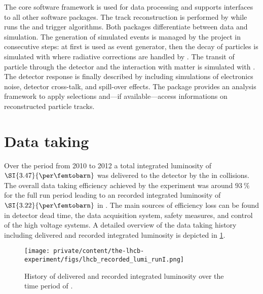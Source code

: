 The \LHCb core software framework \Gaudi \cite{set:soft:gaudi} is used for data
processing and supports interfaces to all other software packages. The track
reconstruction is performed by \Brunel \cite{soft:brunel} while \Moore
\cite{soft:moore} runs the \HLTOne and \HLTTwo trigger algorithms. Both packages
differentiate between data and simulation. The generation of simulated events is
managed by the \Gauss \cite{set:soft:gauss} project in consecutive steps: at
first \Pythia \cite{set:soft:pythia} is used as event generator, then the decay
of particles is simulated with \EvtGen \cite{Lange:2001uf} where radiative
corrections are handled by \Photos \cite{set:soft:photos}. The transit of
particle through the detector and the interaction with matter is simulated with
\GeantFour \cite{set:soft:geantfour}. The detector response is finally described
by \Boole \cite{soft:boole} including simulations of electronics noise, detector
cross-talk, and spill-over effects. The \DaVinci \cite{soft:davinci} package
provides an analysis framework to apply selections and---if available---access
\MC informations on reconstructed particle tracks.

\section{Data taking}
\label{sec:lhcb_experiment:data}

Over the \RunOne period from 2010 to 2012 a total integrated luminosity of
$\SI{3.47}{\per\femtobarn}$ was delivered to the \LHCb detector by the \LHC in
\protonproton collisions. The overall data taking efficiency achieved by the
experiment was around $\SI{93}{\percent}$ for the full run period leading to an
recorded integrated luminosity of $\SI{3.22}{\per\femtobarn}$ in \RunOne. The
main sources of efficiency loss can be found in detector dead time, the data
acquisition system, \VELO safety measures, and control of the high voltage
systems. A detailed overview of the data taking history including delivered and
recorded integrated luminosity is depicted in
\cref{fig:lhcb_experiment:data:integrated_lumi}.
%
\begin{figure}[t]
  \centering
  \texttt{[image: private/content/the-lhcb-experiment/figs/lhcb\_recorded\_lumi\_runI.png]}
  \caption{
    History of delivered and recorded integrated luminosity over the time period
  of \RunOne \cite{lhcb:luminosity}. }
  \label{fig:lhcb_experiment:data:integrated_lumi}
\end{figure}


